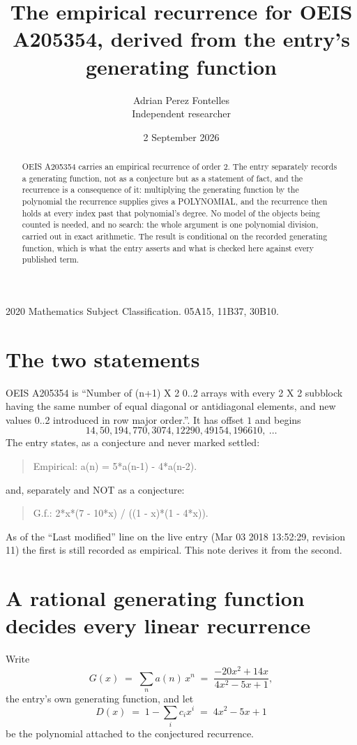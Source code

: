 \documentclass[11pt,a4paper]{article}
\title{The empirical recurrence for OEIS A205354, derived from the entry's generating function}
\author{Adrian Perez Fontelles\\ \small Independent researcher}
\date{2 September 2026}
\theoremstyle{plain}
\theoremstyle{definition}
\begin{document}
\maketitle

\begin{abstract}
OEIS A205354 carries an empirical recurrence of order $2$. The entry separately records a
generating function, not as a conjecture but as a statement of fact, and the recurrence is a
consequence of it: multiplying the generating function by the polynomial the recurrence
supplies gives a POLYNOMIAL, and the recurrence then holds at every index past that
polynomial's degree. No model of the objects being counted is needed, and no search: the
whole argument is one polynomial division, carried out in exact arithmetic. The result is
conditional on the recorded generating function, which is what the entry asserts and what is
checked here against every published term.
\end{abstract}

\noindent\small 2020 Mathematics Subject Classification. 05A15, 11B37, 30B10.\normalsize

\section{The two statements}

OEIS A205354 is ``Number of (n+1) X 2 0..2 arrays with every 2 X 2 subblock having the same number of equal diagonal or antidiagonal elements, and new values 0..2 introduced in row major order.''. It has offset $1$ and begins
\[
14, 50, 194, 770, 3074, 12290, 49154, 196610,\ \dots
\]
The entry states, as a conjecture and never marked settled:
\begin{quote}
Empirical: a(n) = 5*a(n-1) - 4*a(n-2).
\end{quote}
and, separately and NOT as a conjecture:
\begin{quote}
G.f.: 2*x*(7 - 10*x) / ((1 - x)*(1 - 4*x)).
\end{quote}
As of the ``Last modified'' line on the live entry (Mar 03 2018 13:52:29, revision 11) the first is still
recorded as empirical. This note derives it from the second.

\section{A rational generating function decides every linear recurrence}

Write
\[
G(x)\;=\;\sum_{n}a(n)\,x^{n}\;=\;\frac{- 20 x^{2} + 14 x}{4 x^{2} - 5 x + 1},
\]
the entry's own generating function, and let
\[
D(x)\;=\;1-\sum_i c_i x^{i}\;=\;4 x^{2} - 5 x + 1
\]
be the polynomial attached to the conjectured recurrence.
\end{document}
